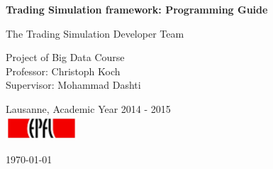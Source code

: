 
\begin{titlepage}

  \begin{center}

    \vspace*{3\baselineskip}
    {\Large \bfseries Trading Simulation framework: Programming Guide\\[0.4cm] }

    \noindent
    The Trading Simulation Developer Team \\[4cm]

    \begin{framed}
    Project of Big Data Course \\
    Professor: Christoph Koch \\
    Supervisor: Mohammad Dashti
    \end{framed}

    \noindent
    Lausanne, Academic Year 2014 - 2015 \\[0.3cm]

    \includegraphics[width=0.2\textwidth]{img/epfl}~\\[1cm]

    \vfill

    {\large \today}

  \end{center}

\end{titlepage}
